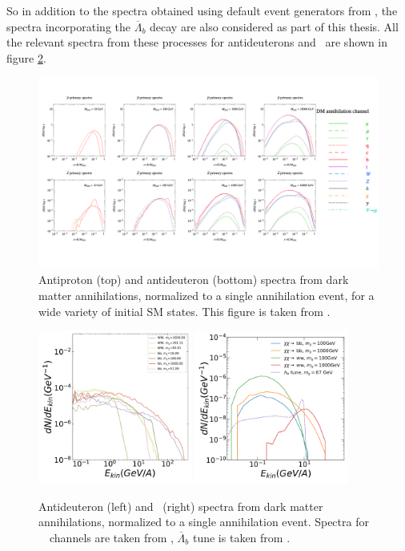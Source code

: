 So in addition to the spectra obtained using default event generators from \cite{}, the spectra incorporating the $\overline{\Lambda}_b$ decay are also considered as part of this thesis. All the relevant spectra from these processes for antideuterons and \ahe\ are shown in figure \ref{fig:DMsource_spectra}. \\ 
\begin{figure}[hbpt]
    \centering
    \includegraphics[width=\textwidth]{figures/cookbook_other_channels.pdf}
		\caption{Antiproton (top) and antideuteron (bottom) spectra from dark matter annihilations, normalized to a single annihilation event, for a wide variety of initial SM states. This figure is taken from \cite{cookbook}.}
    \label{fig:DMsource_spectra_other_channels}
\end{figure}
\begin{figure}[hbpt]
    \centering
    \includegraphics[width=0.45\textwidth]{figures/dbar_injectionSpectra.pdf}
    \includegraphics[width=0.45\textwidth]{figures/He3bar_injection_channels.png}
    \caption{Antideuteron (left) and \ahe\ (right) spectra from dark matter annihilations, normalized to a single annihilation event. Spectra for \WW\ \bb\ channels are taken from \cite{Ibarra:2012cc}, $\overline{\Lambda}_b$ tune is taken from \cite{}.}
    \label{fig:DMsource_spectra}
\end{figure}

